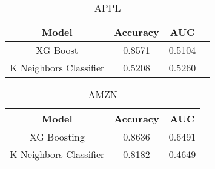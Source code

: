 \documentclass{article}
\title{}
\author{}
\date{}
\begin{document}
\maketitle

\begin{table}[h]
\centering
\begin{tabular}{cccc}
\hline
\textbf{Model} & \textbf{Accuracy} & \textbf{AUC}  \\ \hline
XG Boost &    0.8571 & 0.5104 \\
K Neighbors Classifier &    0.5208	 & 0.5260 \\\hline
\end{tabular}
\caption{APPL}
\end{table}

\begin{table}[h]
\centering
\begin{tabular}{ccc}
\hline
\textbf{Model} & \textbf{Accuracy} & \textbf{AUC} \\ \hline
XG Boosting & 0.8636 & 0.6491 \\
K Neighbors Classifier & 0.8182 & 0.4649 \\ \hline
\end{tabular}
\caption{AMZN}
\end{table}
\end{document}
